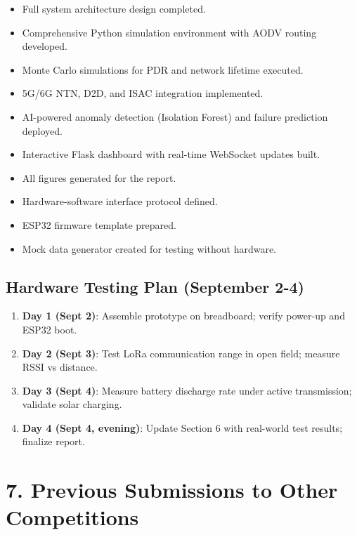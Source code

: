 \documentclass[12pt,a4paper]{article}
\begin{document}
\begin{itemize}
    \item Full system architecture design completed.
    \item Comprehensive Python simulation environment with AODV routing developed.
    \item Monte Carlo simulations for PDR and network lifetime executed.
    \item 5G/6G NTN, D2D, and ISAC integration implemented.
    \item AI-powered anomaly detection (Isolation Forest) and failure prediction deployed.
    \item Interactive Flask dashboard with real-time WebSocket updates built.
    \item All figures generated for the report.
    \item Hardware-software interface protocol defined.
    \item ESP32 firmware template prepared.
    \item Mock data generator created for testing without hardware.
\end{itemize}

\subsection*{Hardware Testing Plan (September 2-4)}

\begin{enumerate}
    \item \textbf{Day 1 (Sept 2)}: Assemble prototype on breadboard; verify power-up and ESP32 boot.
    \item \textbf{Day 2 (Sept 3)}: Test LoRa communication range in open field; measure RSSI vs distance.
    \item \textbf{Day 3 (Sept 4)}: Measure battery discharge rate under active transmission; validate solar charging.
    \item \textbf{Day 4 (Sept 4, evening)}: Update Section 6 with real-world test results; finalize report.
\end{enumerate}

\section*{7. Previous Submissions to Other Competitions}
\end{document}
